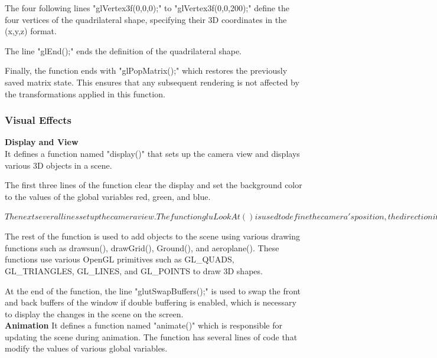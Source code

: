 \documentclass[12pt,a4]{article}
\begin{document}
{The four following lines "glVertex3f(0,0,0);" to "glVertex3f(0,0,200);" define the four vertices of the quadrilateral shape, specifying their 3D coordinates in the (x,y,z) format.

The line "glEnd();" ends the definition of the quadrilateral shape.

Finally, the function ends with "glPopMatrix();" which restores the previously saved matrix state. This ensures that any subsequent rendering is not affected by the transformations applied in this function.\\

\subsubsection{Visual Effects}
\textbf{\Large{Display and View}}\\
It defines a function named "display()" that sets up the camera view and displays various 3D objects in a scene.

The first three lines of the function clear the display and set the background color to the values of the global variables red, green, and blue.

$The next several lines set up the camera view. The function gluLookAt() is used to define the camera's position, the direction it is looking in, and its up direction. The parameters are specified as follows: (cameraX, cameraY, cameraZ) for the camera's position, (lookAtX, lookAtY, lookAtZ) for the direction it is looking in, and (upX, upY, upZ) for the camera's up direction. These parameters are controlled by various global variables such as angle\_t\_z, angle\__x, and pos.$

The rest of the function is used to add objects to the scene using various drawing functions such as drawsun(), drawGrid(), Ground(), and aeroplane(). These functions use various OpenGL primitives such as GL\_QUADS, GL\_TRIANGLES, GL\_LINES, and GL\_POINTS to draw 3D shapes.

At the end of the function, the line "glutSwapBuffers();" is used to swap the front and back buffers of the window if double buffering is enabled, which is necessary to display the changes in the scene on the screen.\\

 \textbf{\Large{Animation}}
It defines a function named "animate()" which is responsible for updating the scene during animation. The function has several lines of code that modify the values of various global variables.

}
\end{document}
